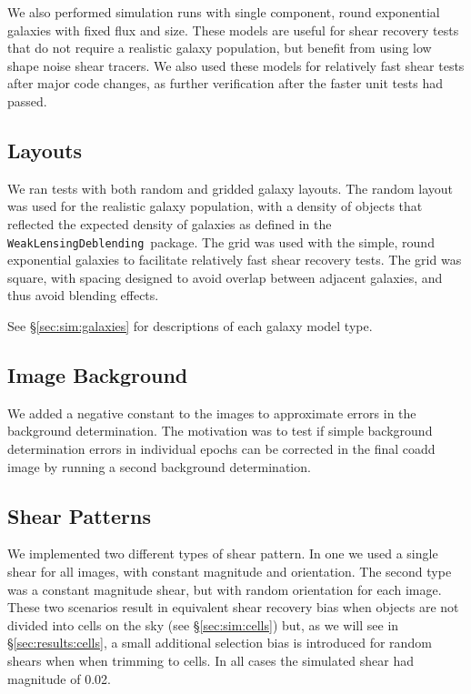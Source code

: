 \documentclass[twocolumn,twocolappendix,astrosym]{openjournal}
\newcommand{\descwl}{\texttt{WeakLensingDeblending}}
\newcommand{\mshear}{0.02}
\begin{document}
We also performed simulation runs with single component, round exponential
galaxies with fixed flux and size.  These models are useful for shear recovery
tests that do not require a realistic galaxy population, but benefit from using
low shape noise shear tracers.  We also used these models for relatively fast
shear tests after major code changes, as further verification after the faster
unit tests had passed.

\subsection{Layouts} \label{sec:sim:layouts}

We ran tests with both random and gridded galaxy layouts.  The random layout
was used for the realistic galaxy population, with a density of objects that
reflected the expected density of galaxies as defined in the \descwl\ package.
The grid was used with the simple, round exponential galaxies to facilitate
relatively fast shear recovery tests.  The grid was square, with spacing
designed to avoid overlap between adjacent galaxies, and thus avoid blending
effects.

See \S \ref{sec:sim:galaxies} for descriptions of each galaxy model type.

\subsection{Image Background} \label{sec:sim:bgerr}

We added a negative constant to the images to approximate errors in the
background determination.  The motivation was to test if simple background
determination errors in individual epochs can be corrected in the final coadd
image by running a second background determination.

\subsection{Shear Patterns} \label{sec:sim:shears}

We implemented two different types of shear pattern.  In one we used a single
shear for all images, with constant magnitude and orientation.  The second type
was a constant magnitude shear, but with random orientation for each image.
These two scenarios result in equivalent shear recovery bias when objects are
not divided into cells on the sky (see \S \ref{sec:sim:cells}) but, as we will
see in \S \ref{sec:results:cells}, a small additional selection bias is
introduced for random shears when when trimming to cells.  In all cases
the simulated shear had magnitude of \mshear.
\end{document}
